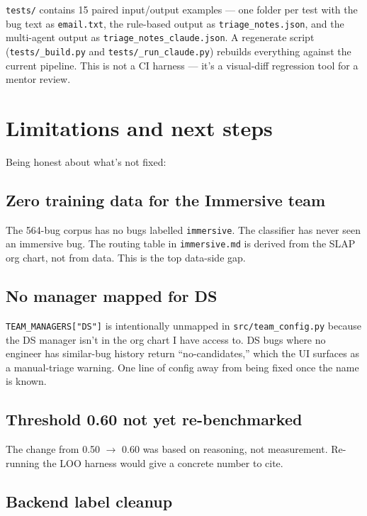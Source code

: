 \documentclass[11pt,a4paper]{article}
\begin{document}
\texttt{tests/} contains 15 paired input/output examples --- one folder
per test with the bug text as \texttt{email.txt}, the rule-based output
as \texttt{triage\_notes.json}, and the multi-agent output as
\texttt{triage\_notes\_claude.json}. A regenerate script
(\texttt{tests/\_build.py} and \texttt{tests/\_run\_claude.py}) rebuilds
everything against the current pipeline. This is not a CI harness --- it's
a visual-diff regression tool for a mentor review.

\newpage

\section{Limitations and next steps}

Being honest about what's not fixed:

\subsection{Zero training data for the Immersive team}

The 564-bug corpus has no bugs labelled \texttt{immersive}. The classifier
has never seen an immersive bug. The routing table in \texttt{immersive.md}
is derived from the SLAP org chart, not from data. This is the top
data-side gap.

\subsection{No manager mapped for DS}

\texttt{TEAM\_MANAGERS["DS"]} is intentionally unmapped in
\texttt{src/team\_config.py} because the DS manager isn't in the org chart
I have access to. DS bugs where no engineer has similar-bug history return
``no-candidates,'' which the UI surfaces as a manual-triage warning. One
line of config away from being fixed once the name is known.

\subsection{Threshold 0.60 not yet re-benchmarked}

The change from 0.50 $\rightarrow$ 0.60 was based on reasoning, not
measurement. Re-running the LOO harness would give a concrete number to
cite.

\subsection{Backend label cleanup}
\end{document}
